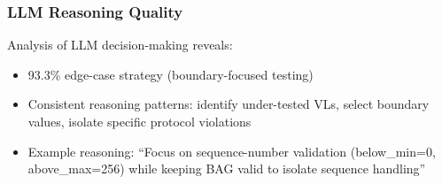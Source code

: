 \subsubsection{LLM Reasoning Quality}

Analysis of LLM decision-making reveals:
\begin{itemize}
\item 93.3\% edge-case strategy (boundary-focused testing)
\item Consistent reasoning patterns: identify under-tested VLs, 
select boundary values, isolate specific protocol violations
\item Example reasoning: ``Focus on sequence-number validation 
(below\_min=0, above\_max=256) while keeping BAG valid to isolate sequence handling''
\end{itemize}